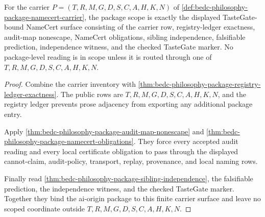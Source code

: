 \begin{theorem}
\label{thm:bedc-philosophy-package-scoped-obligations}
For the carrier $P=(T,R,M,G,D,S,C,A,H,K,N)$ of \autoref{def:bedc-philosophy-package-namecert-carrier}, the package scope is exactly the displayed TasteGate-bound NameCert surface consisting of the carrier row, registry-ledger exactness, audit-map nonescape, NameCert obligations, sibling independence, falsifiable prediction, independence witness, and the checked TasteGate marker. No package-level reading is in scope unless it is routed through one of $T,R,M,G,D,S,C,A,H,K,N$.
\end{theorem}
\begin{proof}
Combine the carrier inventory with \autoref{thm:bedc-philosophy-package-registry-ledger-exactness}. The public rows are $T,R,M,G,D,S,C,A,H,K,N$, and the registry ledger prevents prose adjacency from exporting any additional package entry.

Apply \autoref{thm:bedc-philosophy-package-audit-map-nonescape} and \autoref{thm:bedc-philosophy-package-namecert-obligations}. They force every accepted audit reading and every local certificate obligation to pass through the displayed cannot-claim, audit-policy, transport, replay, provenance, and local naming rows.

Finally read \autoref{thm:bedc-philosophy-package-sibling-independence}, the falsifiable prediction, the independence witness, and the checked TasteGate marker. Together they bind the ai-origin package to this finite carrier surface and leave no scoped coordinate outside $T,R,M,G,D,S,C,A,H,K,N$.
\end{proof}


